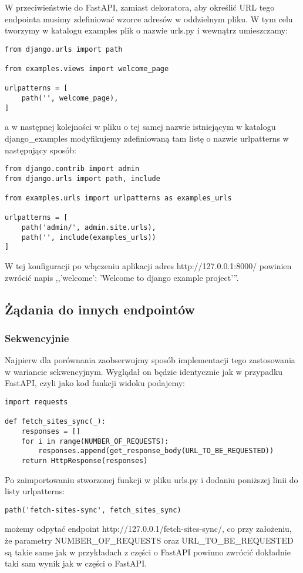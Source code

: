 W przeciwieństwie do FastAPI, zamiast dekoratora, aby określić URL tego endpointa musimy zdefiniować wzorce adresów w oddzielnym pliku. W tym celu tworzymy w katalogu examples plik o nazwie urls.py i wewnątrz umieszczamy:
\begin{lstlisting}
from django.urls import path

from examples.views import welcome_page

urlpatterns = [
    path('', welcome_page),
]
\end{lstlisting}
a w następnej kolejności w pliku o tej samej nazwie istniejącym w katalogu django\_examples modyfikujemy zdefiniowaną tam listę o nazwie urlpatterns w następujący sposób:
\begin{lstlisting}
from django.contrib import admin
from django.urls import path, include

from examples.urls import urlpatterns as examples_urls

urlpatterns = [
    path('admin/', admin.site.urls),
    path('', include(examples_urls))
]

\end{lstlisting}

W tej konfiguracji po włączeniu aplikacji adres http://127.0.0.1:8000/ powinien zwrócić napis ,,{'welcome': 'Welcome to django example project'}''.

\subsection{Żądania do innych endpointów}
\subsubsection{Sekwencyjnie}
Najpierw dla porównania zaobserwujmy sposób implementacji tego zastosowania w wariancie sekwencyjnym. Wyglądał on będzie identycznie jak w przypadku FastAPI, czyli jako kod funkcji widoku podajemy:
\begin{lstlisting}
import requests

def fetch_sites_sync(_):
    responses = []
    for i in range(NUMBER_OF_REQUESTS):
        responses.append(get_response_body(URL_TO_BE_REQUESTED))
    return HttpResponse(responses)
\end{lstlisting}
Po zaimportowaniu stworzonej funkcji w pliku urls.py i dodaniu poniższej linii do listy urlpatterns:
\begin{lstlisting}
path('fetch-sites-sync', fetch_sites_sync)
\end{lstlisting}
możemy odpytać endpoint http://127.0.0.1/fetch-sites-sync/, co przy założeniu, że parametry NUMBER\_OF\_REQUESTS oraz URL\_TO\_BE\_REQUESTED są takie same jak w przykładach z części o FastAPI powinno zwrócić dokładnie taki sam wynik jak w części o FastAPI.

